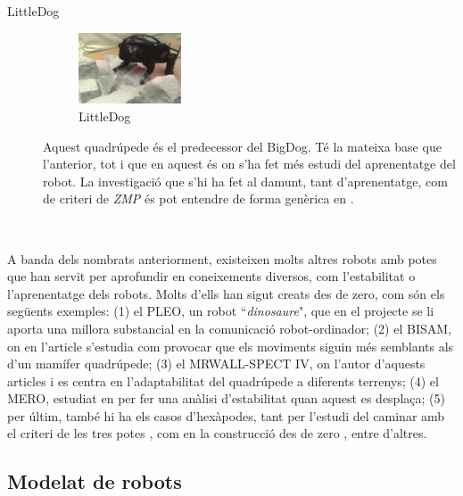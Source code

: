 \documentclass[12pt,a4paper,final,twoside]{report}
\begin{document}
\begin{description}
\item[LittleDog]
\begin{minipage}[t]{0.94\linewidth}
	\begin{figure}
	    \centering
		\includegraphics[width=0.30\textwidth]{Imatges/LittleDog.png}
                \caption{LittleDog \cite{Kalakrishnan2010}}
     \end{figure}
 Aquest quadrúpede és el predecessor del BigDog. Té la mateixa base que l'anterior, tot i que en aquest és on s'ha fet més estudi del aprenentatge del robot. La investigació que s'hi ha fet al damunt, tant d'aprenentatge, com de criteri de \textit{ZMP} és pot entendre de forma genèrica en \cite{Kalakrishnan2010}. 
\end{minipage}\\

\end{description}


A banda dels nombrats anteriorment, existeixen molts altres robots amb potes que han servit per aprofundir en coneixements diversos, com l'estabilitat o l'aprenentatge dels robots. Molts d'ells han sigut creats des de zero, com són els següents exemples: (1) el PLEO, un robot ``\textit{dinosaure}", que en el projecte \cite{Menendez2011} se li aporta una millora substancial en la comunicació robot-ordinador; (2) el BISAM, on en l'article \cite{Albiez2003} s'estudia com provocar que els moviments siguin més semblants als d'un mamífer quadrúpede; (3) el MRWALL-SPECT IV, on l'autor d'aquests articles \cite{Loc2010} i \cite{Loc2011} es centra en l'adaptabilitat del quadrúpede a diferents terrenys; (4) el MERO, estudiat en \cite{Ion} per fer una anàlisi d'estabilitat quan aquest es desplaça; (5) per últim, també hi ha els casos d'hexàpodes, tant per l'estudi del caminar amb el criteri de les tres potes \cite{Lee1988}, com en la construcció des de zero \cite{Lojo2009}, entre d'altres. 


\subsection{Modelat de robots}
\label{Modelat-de-robots}
\end{document}
